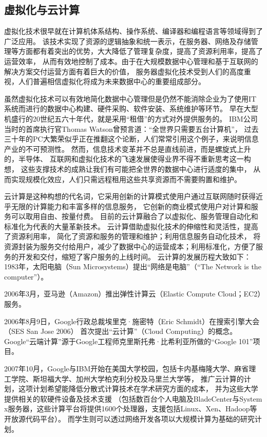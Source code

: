\subsection{虚拟化与云计算}
虚拟化技术很早就在计算机体系结构、操作系统、编译器和编程语言等领域得到了广泛应用。
该技术实现了资源的逻辑抽象和统一表示，在服务器、网络及存储管理等方面都有着突出的优势，大大降低了管理复杂度，提高了资源利用率，提高了运营效率，
从而有效地控制了成本。由于在大规模数据中心管理和基于互联网的解决方案交付运营方面有着巨大的价值，
服务器虚拟化技术受到人们的高度重视，人们普遍相信虚拟化将成为未来数据中心的重要组成部分。

虽然虚拟化技术可以有效地简化数据中心管理\cite{ref17}但是仍然不能消除企业为了使用IT系统而进行的数据中心构建、硬件采购、软件安装、系统维护等环节。
早在大型机盛行的20世纪五六十年代，就是采用“租借”的方式对外提供服务的。
IBM公司当时的首席执行官Thomas Watson曾预言道：“全世界只需要五台计算机”，
过去三十年的PC大繁荣似乎正在推翻这个论断，人们常常引用这个例子，来说明信息产业的不可预测性。
然而，信息技术变革并不总是直线前进，而是螺旋式上升的，半导体、
互联网和虚拟化技术的飞速发展使得业界不得不重新思考这一构想，
这些支撑技术的成熟让我们有可能把全世界的数据中心进行适度的集中，
从而实现规模化效应，人们只需远程租用这些共享资源而不需要购置和维护。

云计算\cite{ref26}是这种构想的代名词，它采用创新的计算模式使用户通过互联网随时获得近乎无限的计算能力和丰富多样的信息服务，
它创新的商业模式使用户对计算和服务可以取用自由、按量付费。
目前的云计算融合了以虚拟化、服务管理自动化和标准化为代表的大量革新技术。
云计算借助虚拟化技术的伸缩性和灵活性，提高了资源利用率，
简化了资源和服务的管理和维护；利用信息服务自动化技术，
将资源封装为服务交付给用户，减少了数据中心的运营成本；利用标准化，方便了服务的开发和交付，缩短了客户服务的上线时间。
云计算的发展历程大致如下：
1983年，太阳电脑（Sun Microsystems）提出“网络是电脑”（“The Network is the computer”）。

2006年3月，亚马逊（Amazon）推出弹性计算云（Elastic Compute Cloud；EC2）服务。

2006年8月9日，Google行政总裁埃里克·施密特（Eric Schmidt）在搜索引擎大会（SES San Jose 2006）
首次提出“云计算”（Cloud Computing）的概念。
Google“云端计算”源于Google工程师克里斯托弗·比希利亚所做的“Google 101”项目。

2007年10月，Google与IBM开始在美国大学校园，包括卡内基梅隆大学、麻省理工学院、斯坦福大学、加州大学柏克利分校及马里兰大学等，
推广云计算的计划，这项计划希望能降低分散式计算技术在学术研究方面的成本，
并为这些大学提供相关的软硬件设备及技术支援
（包括数百台个人电脑及BladeCenter与System x服务器，这些计算平台将提供1600个处理器，支援包括Linux、Xen、Hadoop等开放源代码平台）。
而学生则可以透过网络开发各项以大规模计算为基础的研究计划。

